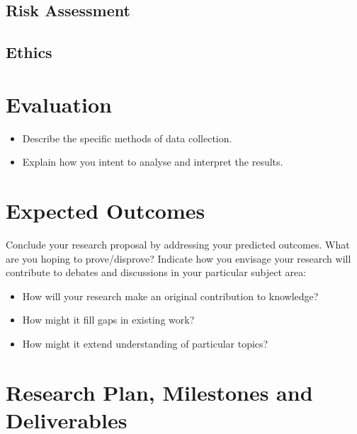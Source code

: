 \documentclass[a4paper,11pt]{article}
\begin{document}
\subsection{Risk Assessment}

\subsection{Ethics}


\section{Evaluation}

\begin{itemize}
    \item Describe the specific methods of data collection.
    \item Explain how you intent to analyse and interpret the results.
\end{itemize}

\section{Expected Outcomes}

Conclude your research proposal by addressing your predicted outcomes. What are you hoping to prove/disprove? Indicate how you envisage your research will contribute to debates and discussions in your particular subject area:

\begin{itemize}
    \item How will your research make an original contribution to knowledge?
    \item How might it fill gaps in existing work? 
    \item How might it extend understanding of particular topics?
\end{itemize}


\section{Research Plan, Milestones and Deliverables}

\end{document}
